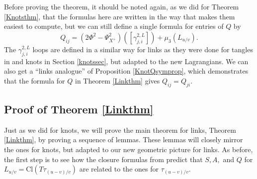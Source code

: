 \documentclass[11pt]{amsart}
\theoremstyle{plain}
\theoremstyle{definition}
\theoremstyle{remark}
\begin{document}
Before proving the theorem, it should be noted again, as we did for Theorem \ref{Knotsthm}, that the formulas here are written in the way that makes them easiest to compute, but we can still define a single formula for entries of $Q$ by
\[
Q_{ij}=(2\Phi^2-\Psi_{X^+}^2)([\gamma_{j,i}^{2,L}])+\mu_3(L_{u/v}).
\]
The $\gamma_{j,i}^{2,L}$ loops are defined in a similar way for links as they were done for tangles in \cite{JHpI26} and knots in Section \ref{knotssec}, but adapted to the new Lagrangians. We can also get a ``links analogue'' of Proposition \ref{KnotQsymprop}, which demonstrates that the formula for $Q$ in Theorem \ref{Linkthm} gives $Q_{ij}=Q_{ji}$.

\subsection{Proof of Theorem \ref{Linkthm}}

Just as we did for knots, we will prove the main theorem for links, Theorem \ref{Linkthm}, by proving a sequence of lemmas. These lemmas will closely mirror the ones for knots, but adapted to our new geometric picture for links. As before, the first step is to see how the closure formulas from \cite{SW21} predict that $S,A,$ and $Q$ for $L_{u/v}=\text{Cl}(T\tau_{(u-v)/v})$ are related to the ones for $\tau_{(u-v)/v}$. 
\end{document}

